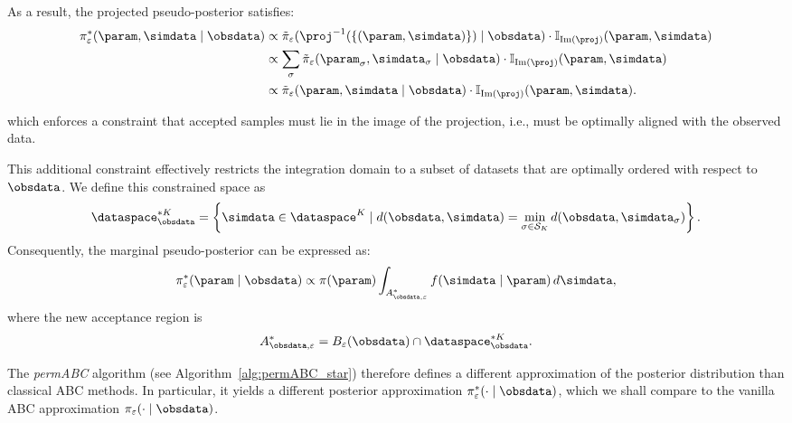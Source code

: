 As a result, the projected pseudo-posterior satisfies:
\begin{equation*}
    \begin{split}
        \pi_{\varepsilon}^* (\param, \simdata \mid \obsdata) &  \propto \Tilde \pi_{\varepsilon} (\proj^{-1}(\{(\param, \simdata)\}) \mid \obsdata)\cdot \mathbb I_{\text{Im}(\proj)}(\param,\simdata)\\
        & \propto \sum_{\sigma} \Tilde \pi_{\varepsilon} (\param_{\sigma}, \simdata_{\sigma} \mid \obsdata)\cdot \mathbb I_{\text{Im}(\proj)}(\param,\simdata)\\
        & \propto \tilde \pi_{\varepsilon}(\param, \simdata\mid \obsdata) \cdot \mathbb I_{\text{Im}(\proj)}(\param,\simdata).
    \end{split}
\end{equation*}


\noindent which enforces a constraint that accepted samples must lie in the image of the projection, i.e., must be optimally aligned with the observed data.

This additional constraint effectively restricts the integration domain to a subset of datasets that are optimally ordered with respect to \( \obsdata \). We define this constrained space as
\[
\dataspace_{\obsdata}^{*K} = \left\{ \simdata \in \dataspace^K \mid d(\obsdata, \simdata) = \min_{\sigma \in \mathcal{S}_K} d(\obsdata, \simdata_{\sigma}) \right\}.
\]
Consequently, the marginal pseudo-posterior can be expressed as:
\begin{equation}
\label{eqpermabc_star}
\pi_{\varepsilon}^*(\param \mid \obsdata) \propto \pi(\param) \int_{A_{\obsdata,\varepsilon}^*} f(\simdata \mid \param) \, d\simdata,
\end{equation}
where the new acceptance region is 
\[
A_{\obsdata,\varepsilon}^* = B_{\varepsilon}(\obsdata) \cap \dataspace_{\obsdata}^{*K}.
\]

The \emph{permABC} algorithm (see Algorithm~\ref{alg:permABC_star}) therefore defines a different approximation of the posterior distribution than classical ABC methods. In particular, it yields a different posterior approximation  \( \pi_{\varepsilon}^*(\cdot \mid \obsdata) \), which we shall compare to the vanilla ABC approximation \( \pi_{\varepsilon}(\cdot \mid \obsdata) \).


